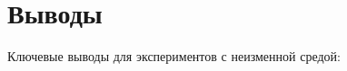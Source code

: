 \documentclass[a4paper]{article}
\begin{document}





  

  

  

\section {Выводы}

Ключевые выводы для экспериментов с неизменной средой:
\end{document}
